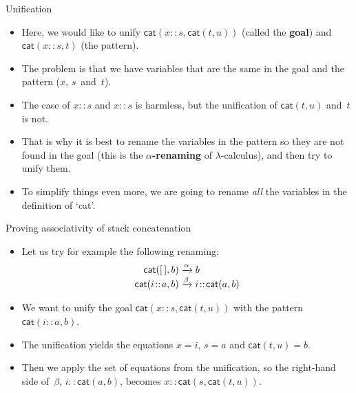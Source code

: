 \documentclass[compress,dvipdfmx]{beamer}
\newcommand\fun[1]{\textsf{#1}}
\newcommand\el{[\,]}
\newcommand\cons[2]{{#1}\!::\!{#2}}
\begin{document}
%
\begin{frame}{Unification}

  \begin{itemize}

    \item Here, we would like to unify
      \(\fun{cat}(\cons{x}{s},\fun{cat}(t,u))\) (called the
      \textbf{goal}) and \(\fun{cat}(\cons{x}{s},t)\) (the pattern).

    \item The problem is that we have variables that are the same in
      the goal and the pattern (\(x\), \(s\)~and~\(t\)).

    \item The case of \(\cons{x}{s}\) and \(\cons{x}{s}\) is harmless,
      but the unification of \(\fun{cat}(t,u)\) and~\(t\) is not.

    \item That is why it is best to rename the variables in the
      pattern so they are not found in the goal (this is the
      \textbf{\(\alpha\)\hyp{}renaming} of \(\lambda\)\hyp{}calculus),
      and then try to unify them.

    \item To simplify things even more, we are going to rename
      \emph{all} the variables in the definition of `\fun{cat}'.

  \end{itemize}

\end{frame}

%
\begin{frame}{Proving associativity of stack concatenation}

  \begin{itemize}

    \item Let us try for example the following renaming:
      \begin{align*}
        \fun{cat}(        \el,b) &\xrightarrow{\alpha} b\\
        \fun{cat}(\cons{i}{a},b) &\xrightarrow{\smash{\beta}}
        \cons{i}{\fun{cat}(a,b)}
      \end{align*}

    \item We want to unify the goal
      \(\fun{cat}(\cons{x}{s},\fun{cat}(t,u))\) with the pattern
      \(\fun{cat}(\cons{i}{a},b)\).

    \item The unification yields the equations \(x = i\), \(s = a\)
      and \(\fun{cat}(t,u) = b\).

    \item Then we apply the set of equations from the unification, so
      the right\hyp{}hand side of~\(\beta\),
      \(\cons{i}{\fun{cat}(a,b)}\), becomes
      \(\cons{x}{\fun{cat}(s,\fun{cat}(t,u))}\).

  \end{itemize}

\end{frame}
\end{document}
